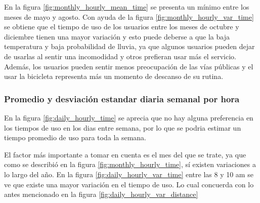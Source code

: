 En la figura \ref{fig:monthly_hourly_mean_time} se presenta un mínimo entre los meses de mayo y agosto. Con ayuda de la figura \ref{fig:monthly_hourly_var_time} se obtiene que el tiempo de uso de los usuarios entre los meses de octubre y diciembre tienen una mayor variación y esto puede deberse a que la baja temperatura y baja probabilidad de lluvia\cite{clima_guadalajara}, ya que algunos usuarios pueden dejar de usarlas al sentir una incomodidad y otros prefieran usar más el servicio. Además, los usuarios pueden sentir menos preocupación de las vías públicas y el usar la bicicleta representa más un momento de descanso de su rutina.

\subsubsection{Promedio y desviación estandar diaria semanal por hora}

En la figura \ref{fig:daily_hourly_time} se aprecia que no hay alguna preferencia en los tiempos de uso en los dias entre semana, por lo que se podria estimar un tiempo promedio de uso para toda la semana.

El factor más importante a tomar en cuenta es el mes del que se trate, ya que como se describió en la figura \ref{fig:monthly_hourly_time}, sí existen variaciones a lo largo del año. En la figura \ref{fig:daily_hourly_var_time} entre las 8 y 10 am se ve que existe una mayor variación en el tiempo de uso. Lo cual concuerda con lo antes mencionado en la figura \ref{fig:daily_hourly_var_distance}

